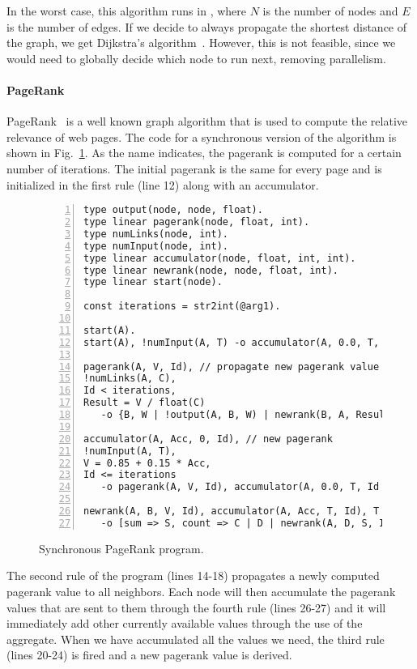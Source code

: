 In the worst case, this algorithm runs in , where $N$ is the number of nodes and $E$ is the
number of edges. If we decide to always propagate the shortest distance of the graph, we get Dijkstra's algorithm~\cite{Dijkstra}. However, this is
not feasible, since we would need to globally decide which node to run next, removing parallelism.

\paragraph{PageRank}

PageRank~\cite{Page:2001:MNR} is a well known graph algorithm that is used to compute the relative relevance of web pages.
The code for a synchronous version of the algorithm is shown in Fig.~\ref{code:pagerank}.
As the name indicates, the pagerank is computed for a certain number of iterations. The initial pagerank is the same for every page and is
initialized in the first rule (line 12) along with an accumulator.


\begin{figure}[h]
   \scriptsize\begin{Verbatim}[numbers=left]
type output(node, node, float).
type linear pagerank(node, float, int).
type numLinks(node, int).
type numInput(node, int).
type linear accumulator(node, float, int, int).
type linear newrank(node, node, float, int).
type linear start(node).

const iterations = str2int(@arg1).

start(A).
start(A), !numInput(A, T) -o accumulator(A, 0.0, T, 1), pagerank(A, 1.0 / float(@world), 0).

pagerank(A, V, Id), // propagate new pagerank value
!numLinks(A, C),
Id < iterations,
Result = V / float(C)
   -o {B, W | !output(A, B, W) | newrank(B, A, Result, Id + 1)}.

accumulator(A, Acc, 0, Id), // new pagerank
!numInput(A, T),
V = 0.85 + 0.15 * Acc,
Id <= iterations
   -o pagerank(A, V, Id), accumulator(A, 0.0, T, Id + 1).
	
newrank(A, B, V, Id), accumulator(A, Acc, T, Id), T > 0
   -o [sum => S, count => C | D | newrank(A, D, S, Id) | 1 | accumulator(A, Acc + V + S, T - 1 - C, Id)].
\end{Verbatim}
\caption{Synchronous PageRank program.}
\label{code:pagerank}
\normalsize
\end{figure}

The second rule of the program (lines 14-18) propagates a newly computed pagerank value to all neighbors. Each node will then accumulate
the pagerank values that are sent to them through the fourth rule (lines 26-27) and it will immediately add other currently available values
through the use of the aggregate. When we have accumulated all the values we need, the third rule (lines 20-24) is fired and a new pagerank value is derived.

